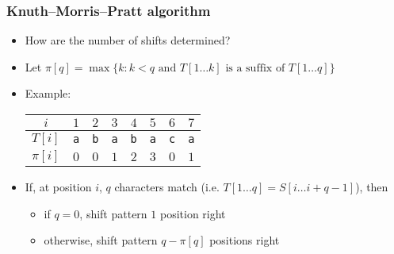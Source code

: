 \documentclass[12pt,t]{beamer}
\begin{document}
\begin{frame}
    \frametitle{Knuth--Morris--Pratt algorithm}
    \vspace{10pt}
    \begin{itemize}
        \item How are the number of shifts determined?
            \vspace{5pt}
        \item Let {\footnotesize $\pi[q] = \max \{ k : k < q \textrm{ and } T[1\ldots k] \textrm{ is a suffix of } T[1\ldots q] \}$}
            \vspace{5pt}
        \item<2-> Example:\\
            \begin{center}
                \begin{tabular}{cccccccc}
                    $i$ & $1$ & $2$ & $3$ & $4$ & $5$ & $6$ & $7$ \\
                    \hline
                    $T[i]$&\texttt{a}&\texttt{b}&\texttt{a}&\texttt{b}&\texttt{a}&\texttt{c}&\texttt{a} \\
                    $\pi[i]$ & $0$ & $0$ & $1$ & $2$ & $3$ & $0$ & $1$\\
                \end{tabular}
            \end{center}
    \vspace{5pt}
        \item<3-> If, at position $i$, $q$ characters match (i.e. $T[1\ldots q] = S[i\ldots i+q-1]$), then
            \begin{itemize}
                \item if $q = 0$, shift pattern $1$ position right
                \item otherwise, shift pattern $q - \pi[q]$ positions right
            \end{itemize}
    \end{itemize}
\end{frame}
\end{document}
